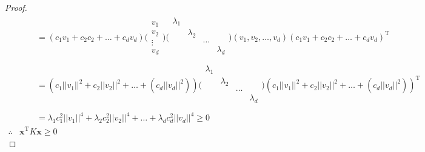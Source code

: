 \documentclass[a4paper]{article}
\begin{document}
\begin{proof}
\begin{align*}
        &\quad\quad=(c_1v_1+c_2c_2+\dots+c_dv_d)\bigl(\begin{smallmatrix} v_1\\v_2\\\vdots\\v_d\end{smallmatrix}\bigr)\bigl(\begin{smallmatrix} \lambda_1 &  &  &\\\  & \lambda_2 &  &\\  &  & \dots &\\  &  &  & \lambda_d\\\end{smallmatrix}\bigr)(v_1,v_2,\dots,v_d)(c_1v_1+c_2c_2+\dots+c_dv_d)^\mathrm{T}\\
        &\quad\quad=(c_1||v_1||^2+c_2||v_2||^2+\dots+(c_d||v_d||^2))\bigl(\begin{smallmatrix} \lambda_1 &  &  &\\\  & \lambda_2 &  &\\  &  & \dots &\\  &  &  & \lambda_d\\\end{smallmatrix}\bigr)(c_1||v_1||^2+c_2||v_2||^2+\dots+(c_d||v_d||^2))^\mathrm{T}\\
        &\quad\quad=\lambda_1c_1^2||v_1||^4+\lambda_2c_2^2||v_2||^4+\dots+\lambda_dc_d^2||v_d||^4\ge0\\
        \therefore&\mathbf{x}^\mathrm{T}K\mathbf{x}\ge0
    \end{align*}
\end{proof}




\end{document}

